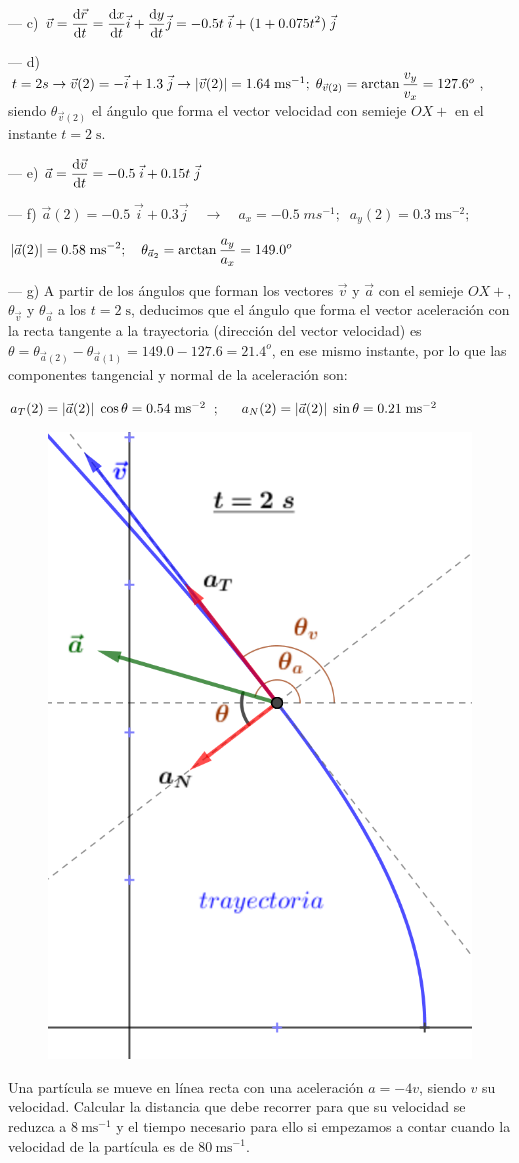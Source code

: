 --- c) $\vec v=\displaystyle\dv{\vec r}{t}= \dv{x}{t}\vec i+\dv{y}{t} \vec j= -0.5t\;\vec i + (1+0.075t^2)\;\vec j $

--- d) $t=2s \to \vec v(2)=-\vec i+1.3\; \vec j \to \abs{\vec v(2)}= 1.64\; \mathrm{ms}^{-1};\; \theta_{\vec v(2)}=\arctan \dfrac {v_y} {v_x}=127.6^o$, siendo $\theta_{\vec v(2)}$ el ángulo que forma el vector velocidad con semieje $OX+$ en el instante $t=2\; \mathrm{s}$.

--- e) $\displaystyle \vec a= \dv{\vec v}{t}=-0.5\;\vec i+ 0.15t\; \vec j$

--- f) $\vec a(2)=-0.5\;\vec i+0.3\vec j \quad \to \quad a_x=-0.5 \; ms^{-1}; \; \; a_y(2)=0.3\;\mathrm{ms}^{-2};$

$\displaystyle   \abs{\vec a(2)}= 0.58\; \mathrm{ms}^{-2};\quad \theta_{\vec a_2}=\arctan \dfrac {a_y} {a_x}=149.0^o$


--- g) A partir de los ángulos que forman los vectores $\vec v$ y $\vec a$ con el semieje $OX+$, $\theta_{\vec v}$ y $\theta_{\vec a}$ a los $t=2\; \mathrm{s}$, deducimos que el ángulo que forma el vector aceleración con la recta tangente a la trayectoria (dirección del vector velocidad) es $\theta=\theta_{\vec a(2)}-\theta_{\vec a(1)}=149.0-127.6=21.4^o$, en ese mismo instante, por lo que las componentes tangencial y normal de la aceleración son:




$a_T(2)=\abs{\vec a(2)}\; \cos \theta=0.54\; \mathrm{ms}^{-2}$
$;\quad$
$a_N(2)=\abs{\vec a(2)}\; \sin \theta=0.21\; \mathrm{ms}^{-2}$

\begin{figure}[H]
		\centering
		\includegraphics[width=.35\textwidth]{imagenes/imagenes02/T02IM19.png}
		\end{figure}


\begin{prob}
Una partícula se mueve en línea recta con una aceleración $a=-4v$, siendo $v$ su velocidad. Calcular la distancia que debe recorrer para que su velocidad se reduzca a $8\ \mathrm{ms}^{-1}$ y el tiempo necesario para ello si empezamos a contar cuando la velocidad de la partícula es de $80\ \mathrm{ms}^{-1}$.	
\end{prob}

